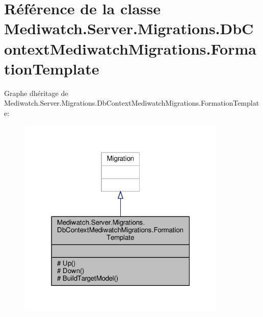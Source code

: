 \hypertarget{class_mediwatch_1_1_server_1_1_migrations_1_1_db_context_mediwatch_migrations_1_1_formation_template}{}\section{Référence de la classe Mediwatch.\+Server.\+Migrations.\+Db\+Context\+Mediwatch\+Migrations.\+Formation\+Template}
\label{class_mediwatch_1_1_server_1_1_migrations_1_1_db_context_mediwatch_migrations_1_1_formation_template}


Graphe d\textquotesingle{}héritage de Mediwatch.\+Server.\+Migrations.\+Db\+Context\+Mediwatch\+Migrations.\+Formation\+Template\+:
\nopagebreak
\begin{figure}[H]
\begin{center}
\leavevmode
\includegraphics[width=283pt]{class_mediwatch_1_1_server_1_1_migrations_1_1_db_context_mediwatch_migrations_1_1_formation_template__inherit__graph}
\end{center}
\end{figure}


